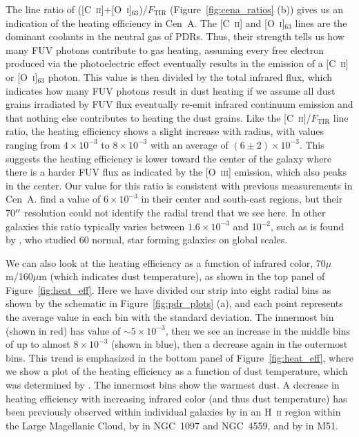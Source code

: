 The line ratio of ([C~\textsc{ii}]+[O~\textsc{i}]$_{63}$)/$F_{\mathrm{TIR}}$ (Figure~\ref{fig:cena_ratios} (b)) gives us an indication of the heating efficiency in Cen~A.  The [C~\textsc{ii}] and [O~\textsc{i}]$_{63}$ lines are the dominant coolants in the neutral gas of PDRs.  Thus, their strength tells us how many FUV photons contribute to gas heating, assuming every free electron produced via the photoelectric effect eventually results in the emission of a [C~\textsc{ii}] or [O~\textsc{i}]$_{63}$ photon.  This value is then divided by the total infrared flux, which indicates how many FUV photons result in dust heating if we assume all dust grains irradiated by FUV flux eventually re-emit infrared continuum emission and that nothing else contributes to heating the dust grains.  Like the [C~\textsc{ii}]/$F_{\mathrm{TIR}}$ line ratio, the heating efficiency shows a slight increase with radius, with values ranging from $4 \times 10^{-3}$ to $8 \times 10^{-3}$ with an average of $(6 \pm 2) \times 10^{-3}$.  This suggests the heating efficiency is lower toward the center of the galaxy where there is a harder FUV flux as indicated by the [O~\textsc{iii}] emission, which also peaks in the center.  Our value for this ratio is consistent with previous measurements in Cen~A. \citet{2000A&A...355..885U} find a value of $6 \times 10^{-3}$ in their center and south-east regions, but their 70$\mbox{$^{\prime\prime}$}$ resolution could not identify the radial trend that we see here.  In other galaxies this ratio typically varies between $1.6 \times 10^{-3}$ and 10$^{-2}$, such as is found by \citet{2001ApJ...561..766M}, who studied 60 normal, star forming galaxies on global scales.

We can also look at the heating efficiency as a function of infrared color, 70$\mu$m/160$\mu$m (which indicates dust temperature), as shown in the top panel of Figure~\ref{fig:heat_eff}.  Here we have divided our strip into eight radial bins as shown by the schematic in Figure~\ref{fig:pdr_plots} (a), and each point represents the average value in each bin with the standard deviation.  The innermost bin (shown in red) has value of $\sim 5 \times 10^{-3}$, then we see an increase in the middle bins of up to almost $8 \times 10^{-3}$ (shown in blue), then a decrease again in the outermost bins.  This trend is emphasized in the bottom panel of Figure~\ref{fig:heat_eff}, where we show a plot of the heating efficiency as a function of dust temperature, which was determined by \citet{2012MNRAS.422.2291P}.  The innermost bins show the warmest dust.  A decrease in heating efficiency with increasing infrared color (and thus dust temperature) has been previously observed within individual galaxies by \citet{2012A&A...548A..91L} in an H~\textsc{ii} region within the Large Magellanic Cloud, by \citet{2012ApJ...747...81C} in NGC~1097 and NGC~4559, and by \citet{parkin_2013} in M51.

